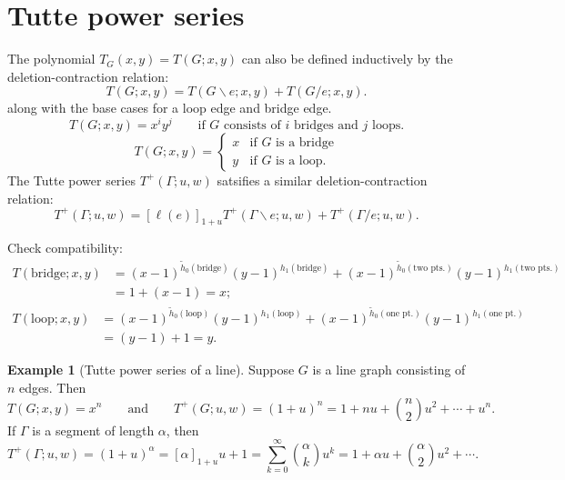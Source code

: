 \documentclass{amsart}
\theoremstyle{definition}
\newtheorem{eg}[thm]{Example}
\begin{document}
\section{Tutte power series}
The polynomial $T_G(x,y) = T(G; x,y)$ can also be defined inductively by the 
deletion-contraction relation:
\begin{equation*}
T(G;x,y) = T(G \backslash e; x,y) + T(G / e; x,y).
\end{equation*}
along with the base cases for a loop edge and bridge edge.
\begin{equation*}
T(G; x,y) = x^i y^j \qquad\text{if $G$ consists of $i$ bridges and $j$ loops.}
\end{equation*}
\begin{equation*}
T(G;x,y) = \begin{cases}
x & \text{if $G$ is a bridge} \\
y & \text{if $G$ is a loop}.
\end{cases}
\end{equation*}
The Tutte power series $T^+(\Gamma; u,w)$ satsifies a similar deletion-contraction relation:
\begin{equation}
T^+(\Gamma; u,w) = [\ell(e)]_{1+u} T^+(\Gamma \backslash e; u,w) + T^+(\Gamma / e; u,w) .
\end{equation}

Check compatibility:
\begin{align*}
T(\text{bridge}; x,y) 
&= (x-1)^{\tilde h_0(\text{bridge}) }(y-1)^{h_1(\text{bridge} )} 
+ (x-1)^{\tilde h_0(\text{two pts.}) }(y-1)^{h_1(\text{two pts.})}  \\
&= 1 + (x-1) = x ;
\end{align*}
\begin{align*}
T(\text{loop}; x,y) 
&= (x-1)^{\tilde h_0(\text{loop}) }(y-1)^{h_1(\text{loop} )} 
+ (x-1)^{\tilde h_0(\text{one pt.}) }(y-1)^{h_1(\text{one pt.})} \\
&= (y-1) + 1 = y .
\end{align*}

\begin{eg}[Tutte power series of a line]
Suppose $G$ is a line graph consisting of $n$ edges.
Then
$$
T(G;x,y) = x^n 
\qquad\text{and}\qquad 
T^+(G;u,w) = (1+u)^n = 1 + nu + \binom{n}{2}u^2 + \cdots + u^n.
$$
If $\Gamma$ is a segment of length $\alpha$,
then
$$
T^+(\Gamma;u,w) = (1+u)^\alpha
= [\alpha]_{1+u} u + 1 = \sum_{k=0}^\infty \binom{\alpha}{k} u^k
= 1 + \alpha u + \binom{\alpha}{2}u^2 + \cdots .
$$
\end{eg}
\end{document}
